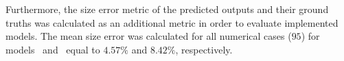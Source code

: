 Furthermore, the size error metric of the predicted outputs and their ground truths was calculated as an additional metric in order to evaluate implemented models. 
The mean size error was calculated for all numerical cases (\(95\)) for models~ and~ equal to \(4.57 \%\) and \(8.42\%\), respectively.

